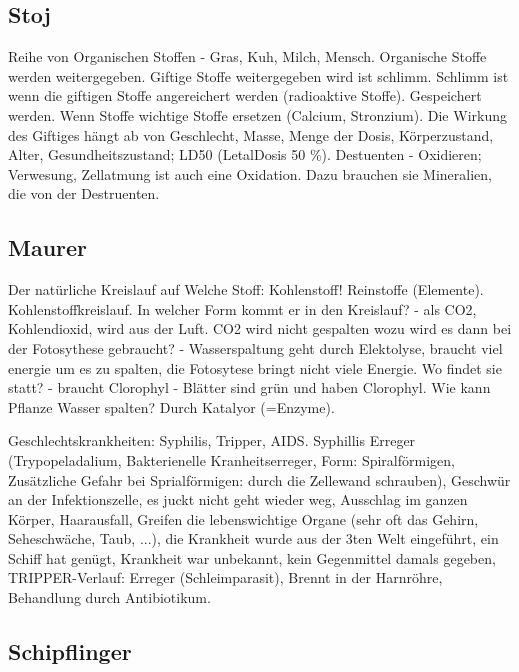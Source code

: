 \documentclass[a4paper]{article}
\begin{document}
\subsection{Stoj}

Reihe von Organischen Stoffen - Gras, Kuh, Milch, Mensch. Organische Stoffe werden weitergegeben. 
Giftige Stoffe weitergegeben wird ist schlimm. Schlimm ist wenn die giftigen Stoffe angereichert werden (radioaktive Stoffe). Gespeichert werden. Wenn Stoffe wichtige Stoffe ersetzen (Calcium, Stronzium). Die Wirkung des Giftiges hängt ab von Geschlecht,  Masse, Menge der Dosis, Körperzustand, Alter, Gesundheitszustand; LD50 (LetalDosis 50 \%).
\newline
\newline
Destuenten - Oxidieren; Verwesung, 
Zellatmung ist auch eine Oxidation. Dazu brauchen sie Mineralien, die von der Destruenten.

\subsection{Maurer}

Der natürliche Kreislauf auf Welche Stoff: Kohlenstoff! Reinstoffe (Elemente). Kohlenstoffkreislauf. In welcher Form kommt er in den Kreislauf? - als CO2, Kohlendioxid, wird aus der Luft. CO2 wird nicht gespalten wozu wird es dann bei der Fotosythese gebraucht? - Wasserspaltung geht durch Elektolyse, braucht viel energie um es zu spalten, die Fotosytese bringt nicht viele Energie. Wo findet sie statt? - braucht Clorophyl - Blätter sind grün und haben Clorophyl. Wie kann Pflanze Wasser spalten? Durch Katalyor (=Enzyme).

Geschlechtskrankheiten: Syphilis, Tripper, AIDS. Syphillis Erreger (Trypopeladalium, Bakterienelle Kranheitserreger, Form: Spiralförmigen, Zusätzliche Gefahr bei Sprialförmigen: durch die Zellewand schrauben), Geschwür an der Infektionszelle, es juckt nicht geht wieder weg, Ausschlag im ganzen Körper, Haarausfall, Greifen die lebenswichtige Organe (sehr oft das Gehirn, Seheschwäche, Taub, ...), die Krankheit wurde aus der 3ten Welt eingeführt, ein Schiff hat genügt, Krankheit war unbekannt, kein Gegenmittel damals gegeben,
TRIPPER-Verlauf: Erreger (Schleimparasit), Brennt in der Harnröhre,
Behandlung durch Antibiotikum.

\subsection{Schipflinger}
\end{document}
